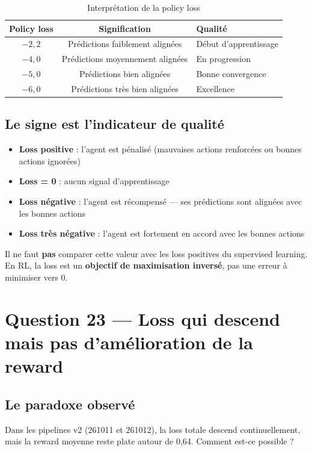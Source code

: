 \documentclass[11pt,a4paper]{article}
\begin{document}
\begin{table}[h]
\centering
\begin{tabular}{ccl}
\toprule
\textbf{Policy loss} & \textbf{Signification} & \textbf{Qualité} \\
\midrule
$-2{,}2$ & Prédictions faiblement alignées & Début d'apprentissage \\
$-4{,}0$ & Prédictions moyennement alignées & En progression \\
$-5{,}0$ & Prédictions bien alignées & Bonne convergence \\
$-6{,}0$ & Prédictions très bien alignées & Excellence \\
\bottomrule
\end{tabular}
\caption{Interprétation de la policy loss}
\end{table}

\subsection{Le signe est l'indicateur de qualité}

\begin{itemize}
    \item \textbf{Loss positive} : l'agent est pénalisé (mauvaises actions renforcées ou bonnes actions ignorées)
    \item \textbf{Loss = 0} : aucun signal d'apprentissage
    \item \textbf{Loss négative} : l'agent est récompensé — ses prédictions sont alignées avec les bonnes actions
    \item \textbf{Loss très négative} : l'agent est fortement en accord avec les bonnes actions
\end{itemize}

Il ne faut \textbf{pas} comparer cette valeur avec les loss positives du supervised learning. En RL, la loss est un \textbf{objectif de maximisation inversé}, pas une erreur à minimiser vers 0.

\section{Question 23 — Loss qui descend mais pas d'amélioration de la reward}

\subsection{Le paradoxe observé}

Dans les pipelines v2 (261011 et 261012), la loss totale descend continuellement, mais la reward moyenne reste plate autour de 0{,}64. Comment est-ce possible ?
\end{document}

